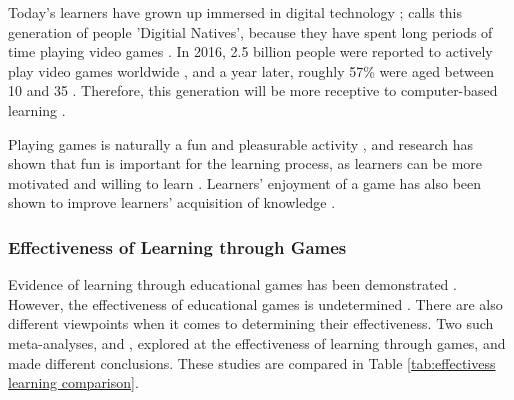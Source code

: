 \documentclass[a4paper,11.5pt]{report}
\numberwithin{figure}{section}
\numberwithin{table}{section}
\numberwithin{equation}{section}
\numberwithin{equation}{section}
\begin{document}
Today's learners have grown up immersed in digital technology \citep{Prensky2001}; \citeauthor{Prensky2001} calls this generation of people 'Digitial Natives', because they have spent long periods of time playing video games \citep{prensky2003}. In 2016, 2.5 billion people were reported to actively play video games worldwide \citep{Statista}, and a year later, roughly 57\% were aged between 10 and 35 \citep{Statistanewzoo}. Therefore, this generation will be more receptive to computer-based learning \citep{Girard2013}.

Playing games is naturally a fun and pleasurable activity \citep{Prensky2001}, and research has shown that fun is important for the learning process, as learners can be more motivated and willing to learn \citep{Bisson1996, Cordova1996}. Learners' enjoyment of a game has also been shown to improve learners' acquisition of knowledge \citep{giannakos2013}.



\subsubsection{Effectiveness of Learning through Games} %

Evidence of learning through educational games has been demonstrated \citep{Connolly2012, Pieter2013, Girard2013}. However, the effectiveness of educational games is undetermined \citep{Connolly2012, Girard2013}. There are also different viewpoints when it comes to determining their effectiveness. Two such meta-analyses, \citet{Pieter2013} and \citet{Girard2013}, explored at the effectiveness of learning through games, and made different conclusions. These studies are compared in Table \ref{tab:effectivess learning comparison}.
\end{document}
